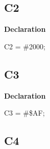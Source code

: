 \documentclass{report}
\newif\ifpdf
\begin{document}
\subsection*{C2}
\fi
\label{ok_read_char_code-C2}
\begin{list}{}{
\setlength{\itemindent}{0cm}
\setlength{\listparindent}{0cm}
\setlength{\leftmargin}{\evensidemargin}
\addtolength{\leftmargin}{\tmplength}
\settowidth{\labelsep}{X}
\addtolength{\leftmargin}{\labelsep}
\setlength{\labelwidth}{\tmplength}
}
\item[\textbf{Declaration}\hfill]
\ifpdf
\begin{flushleft}
\fi
\begin{ttfamily}
C2 = {\#}2000;\end{ttfamily}

\ifpdf
\end{flushleft}
\fi

\end{list}
\ifpdf
\subsection*{\large{\textbf{C3}}\normalsize\hspace{1ex}\hrulefill}
\else
\subsection*{C3}
\fi
\label{ok_read_char_code-C3}
\begin{list}{}{
\setlength{\itemindent}{0cm}
\setlength{\listparindent}{0cm}
\setlength{\leftmargin}{\evensidemargin}
\addtolength{\leftmargin}{\tmplength}
\settowidth{\labelsep}{X}
\addtolength{\leftmargin}{\labelsep}
\setlength{\labelwidth}{\tmplength}
}
\item[\textbf{Declaration}\hfill]
\ifpdf
\begin{flushleft}
\fi
\begin{ttfamily}
C3 = {\#}{\$}AF;\end{ttfamily}

\ifpdf
\end{flushleft}
\fi

\end{list}
\ifpdf
\subsection*{\large{\textbf{C4}}\normalsize\hspace{1ex}\hrulefill}
\else
\end{document}
